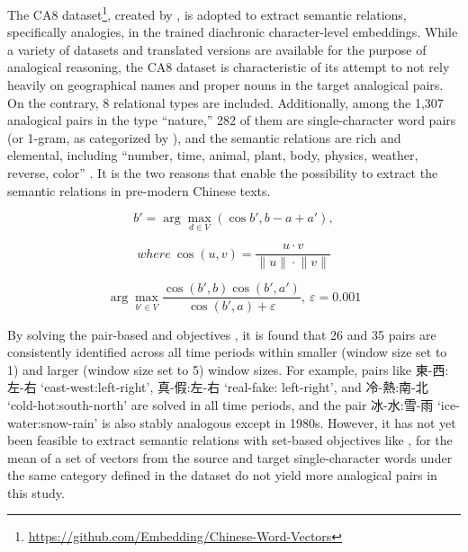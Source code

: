The CA8 dataset\footnote{\url{https://github.com/Embedding/Chinese-Word-Vectors}}, created by \textcite{li2018analogical}, is adopted to extract semantic relations, specifically analogies, in the trained diachronic character-level embeddings. While a variety of datasets and translated versions are available for the purpose of analogical reasoning, the CA8 dataset is characteristic of its attempt to not rely heavily on geographical names and proper nouns in the target analogical pairs. On the contrary, 8 relational types are included. Additionally, among the 1,307 analogical pairs in the type ``nature,'' 282 of them are single-character word pairs (or 1-gram, as categorized by \textcite{li2018analogical}), and the semantic relations are rich and elemental, including ``number, time, animal, plant, body, physics, weather, reverse, color'' \parencite{li2018analogical}. It is the two reasons that enable the possibility to extract the semantic relations in pre-modern Chinese texts.

\begin{equation}
  b' = \arg\max_{d \in V}(\cos b', b - a + a'){,}
\end{equation}

\begin{equation*}
  where\: \cos(u,v) = \frac{u \cdot v}{\lVert{u}\rVert \cdot \lVert{v}\rVert}
\end{equation*}

\begin{equation}
  \arg\max_{b' \in V}\frac{\cos(b',b) \cos(b',a')}{\cos(b',a) + \varepsilon}{,}\: \varepsilon = 0.001
\end{equation}

By solving the pair-based  and  objectives \parencite{levy2014linguistic}, it is found that 26 and 35 pairs are consistently identified across all time periods within smaller (window size set to 1) and larger (window size set to 5) window sizes. For example, pairs like 東-西:左-右 `east-west:left-right', 真-假:左-右 `real-fake: left-right', and 冷-熱:南-北 `cold-hot:south-north' are solved in all time periods, and the pair 冰-水:雪-雨 `ice-water:snow-rain' is also stably analogous except in 1980s. However, it has not yet been feasible to extract semantic relations with set-based objectives like , for the mean of a set of vectors from the source and target single-character words under the same category defined in the dataset do not yield more analogical pairs in this study. %

